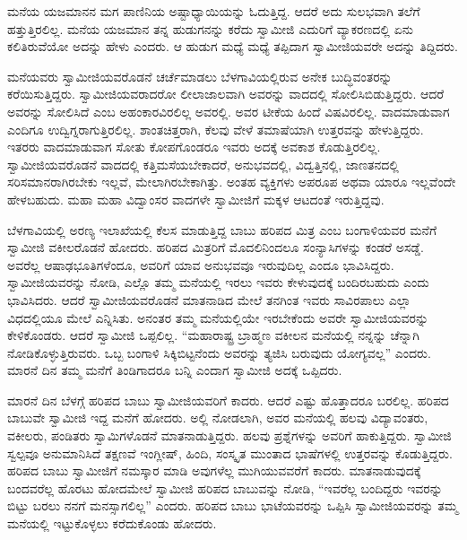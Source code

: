  ಮನೆಯ ಯಜಮಾನನ ಮಗ ಪಾಣಿನಿಯ ಅಷ್ಟಾಧ್ಯಾಯಿಯನ್ನು ಓದುತ್ತಿದ್ದ. ಆದರೆ ಅದು ಸುಲಭವಾಗಿ ತಲೆಗೆ ಹತ್ತುತ್ತಿರಲಿಲ್ಲ. ಮನೆಯ ಯಜಮಾನ ತನ್ನ ಹುಡುಗನನ್ನು ಕರೆದು ಸ್ವಾಮೀಜಿ ಎದುರಿಗೆ ವ್ಯಾಕರಣದಲ್ಲಿ ಏನು ಕಲಿತಿರುವೆಯೋ ಅದನ್ನು ಹೇಳು ಎಂದರು. ಆ ಹುಡುಗ ಮಧ್ಯೆ ಮಧ್ಯೆ ತಪ್ಪಿದಾಗ ಸ್ವಾಮೀಜಿಯವರೇ ಅದನ್ನು ತಿದ್ದಿದರು. 

 ಮನೆಯವರು ಸ್ವಾಮೀಜಿಯವರೊಡನೆ ಚರ್ಚೆಮಾಡಲು ಬೆಳಗಾವಿಯಲ್ಲಿರುವ ಅನೇಕ ಬುದ್ಧಿವಂತರನ್ನು ಕರೆಯಿಸುತ್ತಿದ್ದರು. ಸ್ವಾಮೀಜಿಯವರಾದರೋ ಲೀಲಾಜಾಲವಾಗಿ ಅವರನ್ನು ವಾದದಲ್ಲಿ ಸೋಲಿಸಿಬಿಡುತ್ತಿದ್ದರು. ಆದರೆ ಅವರನ್ನು ಸೋಲಿಸಿದೆ ಎಂಬ ಅಹಂಕಾರವಿರಲಿಲ್ಲ ಅವರಲ್ಲಿ. ಅವರ ಟೀಕೆಯ ಹಿಂದೆ ವಿಷವಿರಲಿಲ್ಲ. ವಾದಮಾಡುವಾಗ ಎಂದಿಗೂ ಉದ್ವಿಗ್ನರಾಗುತ್ತಿರಲಿಲ್ಲ. ಶಾಂತಚಿತ್ತರಾಗಿ, ಕೆಲವು ವೇಳೆ ತಮಾಷೆಯಾಗಿ ಉತ್ತರವನ್ನು ಹೇಳುತ್ತಿದ್ದರು. ಇತರರು ವಾದಮಾಡುವಾಗ ಸೋತು ಕೋಪಗೊಂಡರೂ ಇವರು ಅದಕ್ಕೆ ಅವಕಾಶ ಕೊಡುತ್ತಿರಲಿಲ್ಲ. ಸ್ವಾಮೀಜಿಯವರೊಡನೆ ವಾದದಲ್ಲಿ ಕತ್ತಿಮಸೆಯಬೇಕಾದರೆ, ಅನುಭವದಲ್ಲಿ, ವಿದ್ವತ್ತಿನಲ್ಲಿ, ಜಾಣತನದಲ್ಲಿ ಸರಿಸಮಾನರಾಗಿರಬೇಕು ಇಲ್ಲವೆ, ಮೇಲಾಗಿರಬೇಕಾಗಿತ್ತು. ಅಂತಹ ವ್ಯಕ್ತಿಗಳು ಅಪರೂಪ ಅಥವಾ ಯಾರೂ ಇಲ್ಲವೆಂದೇ ಹೇಳಬಹುದು. ಮಹಾ ಮಹಾ ವಿದ್ವಾಂಸರ ವಾದಗಳೇ ಸ್ವಾಮೀಜಿಗೆ ಮಕ್ಕಳ ಆಟದಂತೆ ಇರುತ್ತಿದ್ದವು. 

 ಬೆಳಗಾವಿಯಲ್ಲಿ ಅರಣ್ಯ ಇಲಾಖೆಯಲ್ಲಿ ಕೆಲಸ ಮಾಡುತ್ತಿದ್ದ ಬಾಬು ಹರಿಪದ ಮಿತ್ರ ಎಂಬ ಬಂಗಾಳಿಯವರ ಮನೆಗೆ ಸ್ವಾಮೀಜಿ ವಕೀಲರೊಡನೆ ಹೋದರು. ಹರಿಪದ ಮಿತ್ರರಿಗೆ ಮೊದಲಿನಿಂದಲೂ ಸಂನ್ಯಾಸಿಗಳನ್ನು ಕಂಡರೆ ಅಸಡ್ಡೆ. ಅವರೆಲ್ಲ ಆಷಾಢಭೂತಿಗಳೆಂದೂ, ಅವರಿಗೆ ಯಾವ ಅನುಭವವೂ ಇರುವುದಿಲ್ಲ ಎಂದೂ ಭಾವಿಸಿದ್ದರು. ಸ್ವಾಮೀಜಿಯವರನ್ನು ನೋಡಿ, ಎಲ್ಲೊ ತಮ್ಮ ಮನೆಯಲ್ಲಿ ಇರಲು ಇವರು ಕೇಳುವುದಕ್ಕೆ ಬಂದಿರಬಹುದು ಎಂದು ಭಾವಿಸಿದರು. ಆದರೆ ಸ್ವಾಮೀಜಿಯವರೊಡನೆ ಮಾತನಾಡಿದ ಮೇಲೆ ತನಗಿಂತ ಇವರು ಸಾವಿರಪಾಲು ಎಲ್ಲಾ ವಿಧದಲ್ಲಿಯೂ ಮೇಲೆ ಎನ್ನಿಸಿತು. ಅನಂತರ ತಮ್ಮ ಮನೆಯಲ್ಲಿಯೇ ಇರಬೇಕೆಂದು ಅವರೇ ಸ್ವಾಮೀಜಿಯವರನ್ನು ಕೇಳಿಕೊಂಡರು. ಆದರೆ ಸ್ವಾಮೀಜಿ ಒಪ್ಪಲಿಲ್ಲ. “ಮಹಾರಾಷ್ಟ್ರ ಬ್ರಾಹ್ಮಣ ವಕೀಲನ ಮನೆಯಲ್ಲಿ ನನ್ನನ್ನು ಚೆನ್ನಾಗಿ ನೋಡಿಕೊಳ್ಳುತ್ತಿರುವರು. ಒಬ್ಬ ಬಂಗಾಳಿ ಸಿಕ್ಕಿಬಿಟ್ಟನೆಂದು ಅವರನ್ನು ತ್ಯಜಿಸಿ ಬರುವುದು ಯೋಗ್ಯವಲ್ಲ” ಎಂದರು. ಮಾರನೆ ದಿನ ತಮ್ಮ ಮನೆಗೆ ತಿಂಡಿಗಾದರೂ ಬನ್ನಿ ಎಂದಾಗ ಸ್ವಾಮೀಜಿ ಅದಕ್ಕೆ ಒಪ್ಪಿದರು. 

\newpage

 ಮಾರನೆ ದಿನ ಬೆಳಗ್ಗೆ ಹರಿಪದ ಬಾಬು ಸ್ವಾಮೀಜಿಯವರಿಗೆ ಕಾದರು. ಆದರೆ ಎಷ್ಟು ಹೊತ್ತಾದರೂ ಬರಲಿಲ್ಲ. ಹರಿಪದ ಬಾಬುವೇ ಸ್ವಾಮೀಜಿ ಇದ್ದ ಮನೆಗೆ ಹೋದರು. ಅಲ್ಲಿ ನೋಡಲಾಗಿ, ಅವರ ಮನೆಯಲ್ಲಿ ಹಲವು ವಿದ್ಯಾವಂತರು, ವಕೀಲರು, ಪಂಡಿತರು ಸ್ವಾಮಿಗಳೊಡನೆ ಮಾತನಾಡುತ್ತಿದ್ದರು. ಹಲವು ಪ್ರಶ್ನೆಗಳನ್ನು ಅವರಿಗೆ ಹಾಕುತ್ತಿದ್ದರು. ಸ್ವಾಮೀಜಿ ಸ್ವಲ್ಪವೂ ಅನುಮಾನಿಸಿದೆ ತಕ್ಷಣವೆ ಇಂಗ್ಲೀಷ್, ಹಿಂದಿ, ಸಂಸ್ಕೃತ ಮುಂತಾದ ಭಾಷೆಗಳಲ್ಲಿ ಉತ್ತರವನ್ನು ಕೊಡುತ್ತಿದ್ದರು. ಹರಿಪದ ಬಾಬು ಸ್ವಾಮೀಜಿಗೆ ನಮಸ್ಕಾರ ಮಾಡಿ ಅವುಗಳೆಲ್ಲ ಮುಗಿಯುವವರೆಗೆ ಕಾದರು. ಮಾತನಾಡುವುದಕ್ಕೆ ಬಂದವರೆಲ್ಲ ಹೊರಟು ಹೋದಮೇಲೆ ಸ್ವಾಮೀಜಿ ಹರಿಪದ ಬಾಬುವನ್ನು ನೋಡಿ, “ಇವರೆಲ್ಲ ಬಂದಿದ್ದರು ಇವರನ್ನು ಬಿಟ್ಟು ಬರಲು ನನಗೆ ಮನಸ್ಸಾಗಲಿಲ್ಲ” ಎಂದರು. ಹರಿಪದ ಬಾಬು ಭಾಟೆಯವರನ್ನು ಒಪ್ಪಿಸಿ ಸ್ವಾಮೀಜಿಯವರನ್ನು ತಮ್ಮ ಮನೆಯಲ್ಲಿ ಇಟ್ಟುಕೊಳ್ಳಲು ಕರೆದುಕೊಂಡು ಹೋದರು. 

